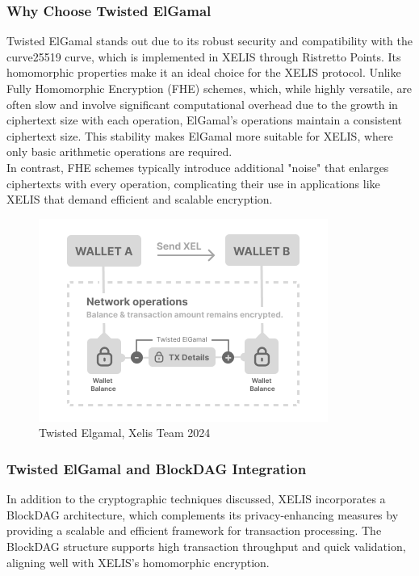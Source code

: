 \documentclass[12pt,a4paper,twocolumn]{article}
\begin{document}
\subsubsection{Why Choose Twisted ElGamal}

Twisted ElGamal stands out due to its robust security and compatibility with the curve25519 curve, which is implemented in XELIS through Ristretto Points. Its homomorphic properties make it an ideal choice for the XELIS protocol. Unlike Fully Homomorphic Encryption (FHE) schemes, which, while highly versatile, are often slow and involve significant computational overhead due to the growth in ciphertext size with each operation, ElGamal’s operations maintain a consistent ciphertext size. This stability makes ElGamal more suitable for XELIS, where only basic arithmetic operations are required.\\

In contrast, FHE schemes typically introduce additional "noise" that enlarges ciphertexts with every operation, complicating their use in applications like XELIS that demand efficient and scalable encryption.\\

\begin{figure}
    \centering
    \includegraphics[width=0.9\linewidth]{ElGamal Homomorphic XEL (1).png}
    \caption{Twisted Elgamal, Xelis Team 2024}
    \label{fig:enter-label}
\end{figure}


\subsubsection{Twisted ElGamal and BlockDAG Integration}

In addition to the cryptographic techniques discussed, XELIS incorporates a BlockDAG architecture, which complements its privacy-enhancing measures by providing a scalable and efficient framework for transaction processing. The BlockDAG structure supports high transaction throughput and quick validation, aligning well with XELIS’s homomorphic encryption.\\
\end{document}
